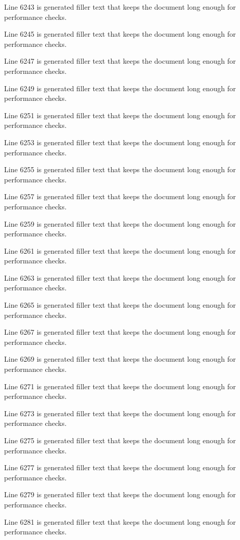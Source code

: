 Line 6243 is generated filler text that keeps the document long enough for performance checks.

Line 6245 is generated filler text that keeps the document long enough for performance checks.

Line 6247 is generated filler text that keeps the document long enough for performance checks.

Line 6249 is generated filler text that keeps the document long enough for performance checks.

Line 6251 is generated filler text that keeps the document long enough for performance checks.

Line 6253 is generated filler text that keeps the document long enough for performance checks.

Line 6255 is generated filler text that keeps the document long enough for performance checks.

Line 6257 is generated filler text that keeps the document long enough for performance checks.

Line 6259 is generated filler text that keeps the document long enough for performance checks.

Line 6261 is generated filler text that keeps the document long enough for performance checks.

Line 6263 is generated filler text that keeps the document long enough for performance checks.

Line 6265 is generated filler text that keeps the document long enough for performance checks.

Line 6267 is generated filler text that keeps the document long enough for performance checks.

Line 6269 is generated filler text that keeps the document long enough for performance checks.

Line 6271 is generated filler text that keeps the document long enough for performance checks.

Line 6273 is generated filler text that keeps the document long enough for performance checks.

Line 6275 is generated filler text that keeps the document long enough for performance checks.

Line 6277 is generated filler text that keeps the document long enough for performance checks.

Line 6279 is generated filler text that keeps the document long enough for performance checks.

Line 6281 is generated filler text that keeps the document long enough for performance checks.

